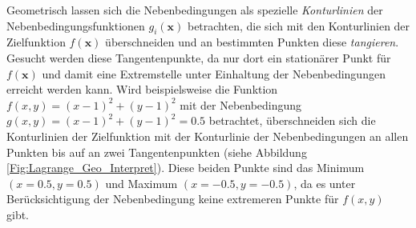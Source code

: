 \documentclass[12pt, a4paper]{report}\usepackage[]{graphicx}\usepackage[]{color}
\begin{document}
\begin{appendix}
Geometrisch lassen sich die Nebenbedingungen als spezielle \textit{Konturlinien} der Nebenbedingungsfunktionen $g_i(\mathbf{x})$ betrachten, die sich mit den Konturlinien der Zielfunktion $f(\mathbf{x})$ überschneiden und an bestimmten Punkten diese \textit{tangieren}. Gesucht werden diese Tangentenpunkte, da nur dort ein stationärer Punkt für $f(\mathbf{x})$ und damit eine Extremstelle unter Einhaltung der Nebenbedingungen erreicht werden kann. Wird beispielsweise die Funktion $f(x,y)=(x-1)^2 + (y-1)^2$ mit der Nebenbedingung $g(x,y)=(x-1)^2+(y-1)^2=0.5$ betrachtet, überschneiden sich die Konturlinien der Zielfunktion mit der Konturlinie der Nebenbedingungen an allen Punkten bis auf an zwei Tangentenpunkten (siehe Abbildung \ref{Fig:Lagrange_Geo_Interpret}). Diese beiden Punkte sind das Minimum $(x=0.5,y=0.5)$ und Maximum $(x=-0.5,y=-0.5)$, da es unter Berücksichtigung der Nebenbedingung keine extremeren Punkte für $f(x,y)$ gibt.\\


\end{appendix}
\end{document}
